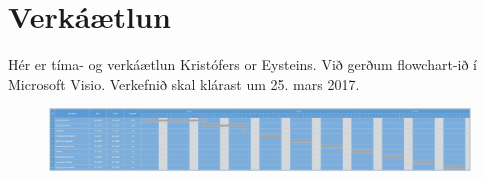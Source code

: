 \section{Verkáætlun}
Hér er tíma- og verkáætlun Kristófers or Eysteins. Við gerðum flowchart-ið í Microsoft Visio. Verkefnið skal klárast um 25. mars 2017. 
\begin{figure}[h]
\includegraphics[scale=.3]{img/Timaogverkplan}
\end{figure}
